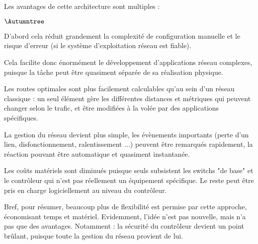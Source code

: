 Les avantages de cette architecture sont multiples :
\begin{list}{$\Autumntree$}{}
\item D'abord cela réduit grandement la complexité de configuration manuelle et le risque d'erreur (si le système d'exploitation réseau est fiable).
\item Cela facilite donc énormément le développement d'applications réseau complexes, puisque la tâche peut être quasiment séparée de sa réalisation physique.
\item Les routes optimales sont plus facilement calculables qu'au sein d'un réseau classique : un seul élément gère les différentes distances et métriques qui peuvent changer selon le trafic, et être modifiées à la volée par des applications spécifiques.
\item La gestion du réseau devient plus simple, les évènements importants (perte d'un lien, disfonctionnement, ralentissement ...) peuvent être remarqués rapidement, la réaction pouvant être automatique et quasiment instantanée.
\item Les coûts matériels sont diminués puisque seuls subsistent les switchs "de base" et le contrôleur qui n'est pas réellement un équipement spécifique. Le reste peut être pris en charge logiciellement au niveau du contrôleur.
\end{list}

Bref, pour résumer, beaucoup plus de flexibilité est permise par cette approche, économisant temps et matériel. Evidemment, l'idée n'est pas nouvelle, mais n'a pas que des avantages. Notamment : la sécurité du contrôleur devient un point brûlant, puisque toute la gestion du réseau provient de lui.